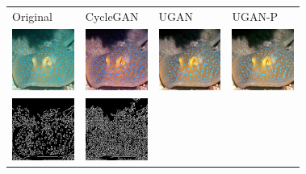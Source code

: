 \documentclass[conference,reqno]{IEEEtran}
\begin{document}
\begin{figure}
\centering
\begin{tabular}{p{1.7cm} p{1.7cm} p{1.7cm} p{1.5cm}}


   \small{Original} & \small{CycleGAN} & \small{UGAN} & \small{UGAN-P} \\

   \includegraphics[width=0.8in]{n01496331_15872_original} &
   \includegraphics[width=0.8in]{n01496331_15872_cimg}     &
   \includegraphics[width=0.8in]{n01496331_15872_u0img}    &
   \includegraphics[width=0.8in]{n01496331_15872_u1img}    \\ [-1ex]
   \includegraphics[width=0.8in]{n01496331_15872_oedges}   &
   \includegraphics[width=0.8in]{n01496331_15872_cedges}   &

\end{tabular}
\end{figure}
\end{document}
